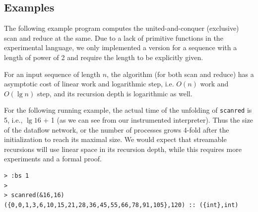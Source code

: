 %
%
%


\subsection{Examples}

The following example program computes the united-and-conquer (exclusive) scan and reduce at the same. 
Due to a lack of primitive functions in the experimental language, we only implemented a version for a sequence with a length of power of 2 and require the length to be explicitly given. 

For an input sequence of length $n$, the algorithm (for both scan and reduce) has a asymptotic cost of linear work and logarithmic step, i.e. $O(n)$ work and $O(\lg{n})$ step, and its recursion depth is logarithmic as well. \\


\vspace{0.5cm}

For the following running example, the actual time of the unfolding of \texttt{scanred} is 5, i.e., $\lg 16$ + 1 (as we can see from our instrumented interpreter). Thus the size of the dataflow network, or the number of processes grows 4-fold after the initialization to reach its maximal size.
We would expect that streamable recursions will use linear space in its recursion depth, while this requires more experiments and a formal proof. \\

\begin{lstlisting}[style=nesl-style]
> :bs 1
> 
> scanred(&16,16)
({0,0,1,3,6,10,15,21,28,36,45,55,66,78,91,105},120) :: ({int},int)
\end{lstlisting}
